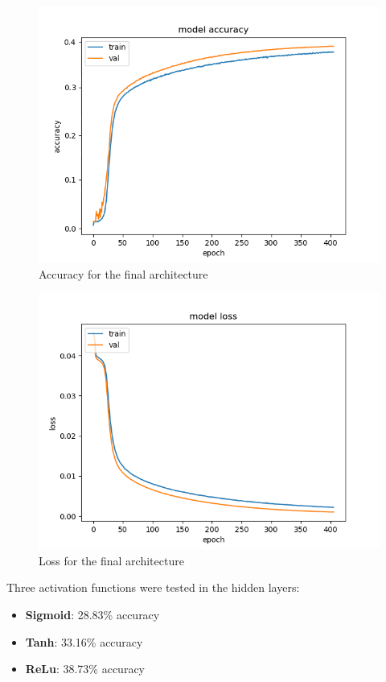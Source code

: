 \begin{figure}[h!]
	\caption[Accuracy progression over the epochs]{ Accuracy for the final architecture}
	\centering
	\label{fig:acc}
	\includegraphics[width=1\textwidth, height=\textheight, keepaspectratio]{"resources/acc"}
\end{figure}

\begin{figure}[h!]
	\caption[Loss progression over the epochs]{ Loss for the final architecture}
	\centering
	\label{fig:loss}
	\includegraphics[width=1\textwidth, height=\textheight, keepaspectratio]{"resources/loss"}
\end{figure}


Three activation functions were tested in the hidden layers:
\begin{itemize}
	\item \textbf{Sigmoid}: 28.83\% accuracy
	\item \textbf{Tanh}: 33.16\% accuracy
	\item \textbf{ReLu}: 38.73\% accuracy
\end{itemize}

